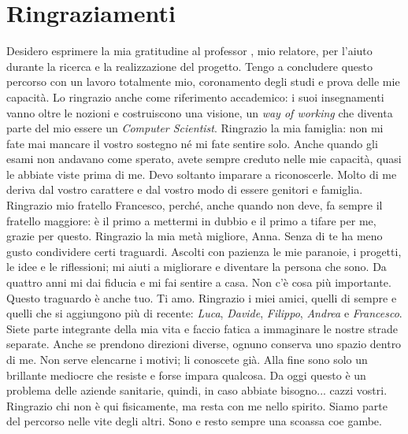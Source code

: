 \cleardoublepage
{}
{}


\begingroup
\let\clearpage\relax
\let\cleardoublepage\relax
\let\cleardoublepage\relax

\chapter*{Ringraziamenti}

\noindent Desidero esprimere la mia gratitudine al professor \myProf, mio relatore, per l'aiuto durante la ricerca e la realizzazione del progetto. Tengo a concludere questo percorso con un lavoro totalmente mio, coronamento degli studi e prova delle mie capacità. Lo ringrazio anche come riferimento accademico: i suoi insegnamenti vanno oltre le nozioni e costruiscono una visione, un \emph{way of working} che diventa parte del mio essere un \emph{Computer Scientist}.
\noindent Ringrazio la mia famiglia: non mi fate mai mancare il vostro sostegno né mi fate sentire solo. Anche quando gli esami non andavano come sperato, avete sempre creduto nelle mie capacità, quasi le abbiate viste prima di me. Devo soltanto imparare a riconoscerle. Molto di me deriva dal vostro carattere e dal vostro modo di essere genitori e famiglia.
\noindent Ringrazio mio fratello Francesco, perché, anche quando non deve, fa sempre il fratello maggiore: è il primo a mettermi in dubbio e il primo a tifare per me, grazie per questo.
\noindent Ringrazio la mia metà migliore, Anna. Senza di te ha meno gusto condividere certi traguardi. Ascolti con pazienza le mie paranoie, i progetti, le idee e le riflessioni; mi aiuti a migliorare e diventare la persona che sono. Da quattro anni mi dai fiducia e mi fai sentire a casa. Non c'è cosa più importante. Questo traguardo è anche tuo. Ti amo.
\noindent Ringrazio i miei amici, quelli di sempre e quelli che si aggiungono più di recente: \emph{Luca}, \emph{Davide}, \emph{Filippo}, \emph{Andrea} e \emph{Francesco}. Siete parte integrante della mia vita e faccio fatica a immaginare le nostre strade separate. Anche se prendono direzioni diverse, ognuno conserva uno spazio dentro di me. Non serve elencarne i motivi; li conoscete già.
\noindent Alla fine sono solo un brillante mediocre che resiste e forse impara qualcosa. Da oggi questo è un problema delle aziende sanitarie, quindi, in caso abbiate bisogno... cazzi vostri. \\
\noindent Ringrazio chi non è qui fisicamente, ma resta con me nello spirito. Siamo parte del percorso nelle vite degli altri.
\noindent Sono e resto sempre una scoassa coe gambe.

\vspace{0.75cm}

\noindent{\myLocation, \myTime}
\hfill \textit{\myName}

\endgroup
